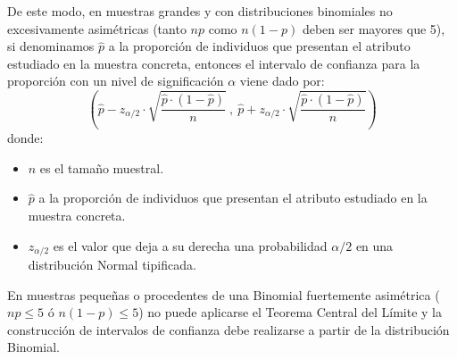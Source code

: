 De este modo, en muestras grandes y con distribuciones binomiales no excesivamente asimétricas (tanto $np$ como $n(1-p)$
deben ser mayores que 5), si denominamos $\widehat{p}$ a la proporción de individuos que presentan el atributo estudiado
en la muestra concreta, entonces el intervalo de confianza para la proporción con un nivel de significación $\alpha$
viene dado por:
\[
\left( \widehat{p}-z_{\alpha /2}\cdot \sqrt{\dfrac{\widehat{p}\cdot (1-%
\widehat{p})}{n}}\ ,\ \widehat{p}+z_{\alpha /2}\cdot \sqrt{\dfrac{\widehat{p}%
\cdot (1-\widehat{p})}{n}}\right)
\]
donde:
\begin{itemize}[label=--]
\item $n$ es el tamaño muestral.
\item $\widehat{p}$ a la proporción de individuos que presentan el atributo estudiado en la muestra concreta.
\item $z_{\alpha /2}$ es el valor que deja a su derecha una probabilidad $\alpha /2 $ en una distribución Normal
tipificada.
\end{itemize}

En muestras pequeñas o procedentes de una Binomial fuertemente asimétrica ($np \leq 5$ ó $n(1-p)\leq 5$) no puede
aplicarse el Teorema Central del Límite y la construcción de intervalos de confianza debe realizarse a partir de la
distribución Binomial.

\clearpage
\newpage


